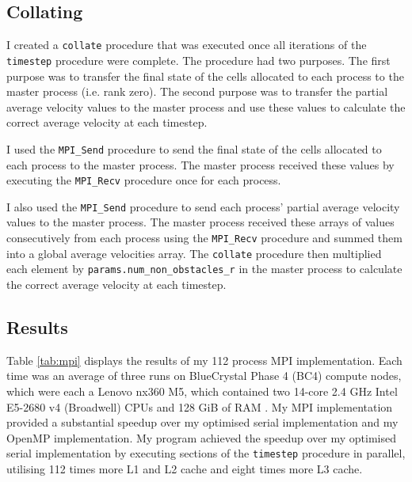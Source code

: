 \documentclass[twocolumn, a4paper]{article}
\begin{document}
\subsection{Collating}

I created a \texttt{collate} procedure that was executed once all iterations of the \texttt{timestep} procedure were complete.
The procedure had two purposes.
The first purpose was to transfer the final state of the cells allocated to each process to the master process (i.e. rank zero).
The second purpose was to transfer the partial average velocity values to the master process and use these values to calculate the correct average velocity at each timestep.

I used the \texttt{MPI\_Send} procedure to send the final state of the cells allocated to each process to the master process.
The master process received these values by executing the \texttt{MPI\_Recv} procedure once for each process.

I also used the \texttt{MPI\_Send} procedure to send each process' partial average velocity values to the master process.
The master process received these arrays of values consecutively from each process using the \texttt{MPI\_Recv} procedure and summed them into a global average velocities array.
The \texttt{collate} procedure then multiplied each element by \texttt{params.num\_non\_obstacles\_r} in the master process to calculate the correct average velocity at each timestep.

\subsection{Results}

Table \ref{tab:mpi} displays the results of my 112 process MPI implementation.
Each time was an average of three runs on BlueCrystal Phase 4 (BC4) compute nodes, which were each a Lenovo nx360 M5, which contained two 14-core 2.4 GHz Intel E5-2680 v4 (Broadwell) CPUs and 128 GiB of RAM \cite{bcp4}.
My MPI implementation provided a substantial speedup over my optimised serial implementation and my OpenMP implementation.
My program achieved the speedup over my optimised serial implementation by executing sections of the \texttt{timestep} procedure in parallel, utilising 112 times more L1 and L2 cache and eight times more L3 cache.
\end{document}
